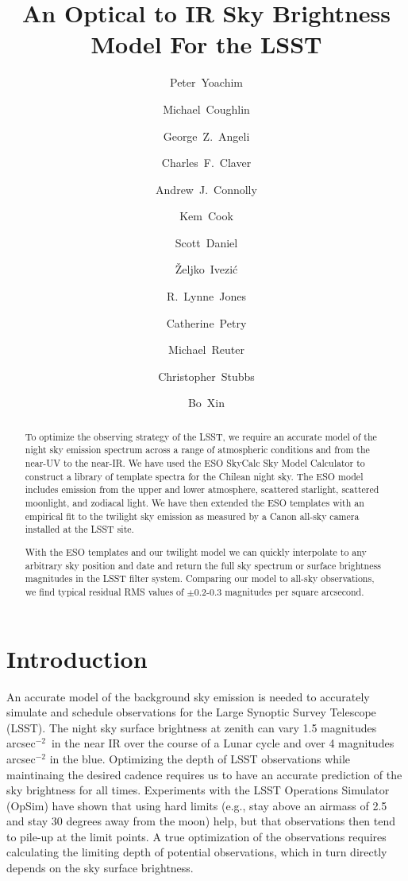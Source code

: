 \documentclass[]{spie}
\title{An Optical to IR Sky Brightness Model For the LSST}
\author[a]{Peter~Yoachim}
\author[b]{Michael~Coughlin}
\author[c]{George~Z.~Angeli }
\author[c]{Charles~F.~Claver }
\author[a]{Andrew~J.~Connolly}
\author[d]{Kem~Cook}
\author[a]{Scott~Daniel}
\author[a]{\v{Z}eljko~Ivezi\'{c}}
\author[a]{R.~Lynne~Jones}
\author[c]{Catherine~Petry}
\author[c]{Michael~Reuter}
\author[b]{Christopher~Stubbs}
\author[c]{Bo~Xin}
\affil[a]{University of Washington, Seattle, WA, USA}
\affil[b]{Harvard University, Boston, MA, USA}
\affil[c]{LSST Observatory, Tucson, AZ, USA}
\affil[d]{Cook Astronomical Consulting, CA, USA}
\begin{document}
\maketitle

\begin{abstract}
  To optimize the observing strategy of the LSST, we require an accurate model of the night sky emission spectrum across a range of atmospheric conditions and from the near-UV to the near-IR.  We have used the ESO SkyCalc Sky Model Calculator \cite{Noll12,Jones13} to construct a library of template spectra for the Chilean night sky.  The ESO model includes emission from the upper and lower atmosphere, scattered starlight, scattered moonlight, and zodiacal light.
  We have then extended the ESO templates with an empirical fit to the twilight sky emission as measured by a Canon all-sky camera installed at the LSST site.

  With the ESO templates and our twilight model we can quickly interpolate to any arbitrary sky position and date and return the full sky spectrum or surface brightness magnitudes in the LSST filter system. Comparing our model to all-sky observations, we find typical residual RMS values of $\pm$0.2-0.3 magnitudes per square arcsecond.
\end{abstract}


\section{Introduction}

An accurate model of the background sky emission is needed to accurately simulate and schedule observations for the Large Synoptic Survey Telescope (LSST)\cite{Kahn16}.  The night sky surface brightness at zenith can vary 1.5 magnitudes arcsec$^{-2}$\ in the near IR over the course of a Lunar cycle and over 4 magnitudes arcsec$^{-2}$ in the blue.  Optimizing the depth of LSST observations while maintinaing the desired cadence requires us to have an accurate prediction of the sky brightness for all times.  Experiments with the LSST Operations Simulator (OpSim) \cite{Delgado14} have shown that using hard limits (e.g., stay above an airmass of 2.5 and stay 30 degrees away from the moon) help, but that observations then tend to pile-up at the limit points.  A true optimization of the observations requires calculating the limiting depth of potential observations, which in turn directly depends on the sky surface brightness.
\end{document}

